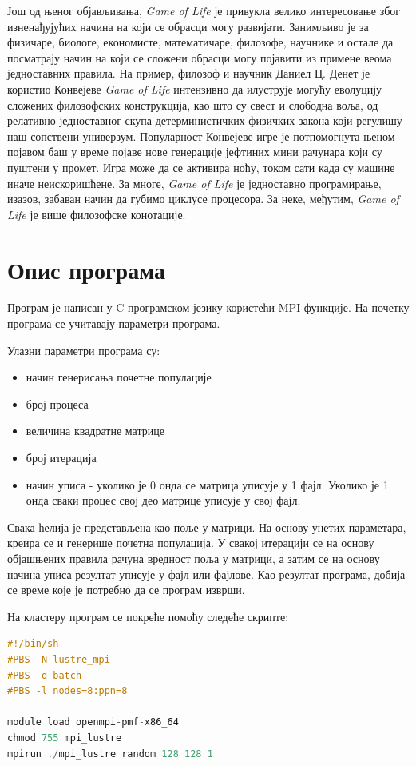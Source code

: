Још од њеног објављивања, \textit{Game of Life} је привукла велико интересовање због изненађујућих начина на који се обрасци могу развијати. Занимљиво је за физичаре, биологе, економисте, математичаре, филозофе, научнике и остале да посматрају начин на који се сложени обрасци могу појавити из примене веома једноставних правила. На пример, филозоф и научник Даниел Ц. Денет је користио Конвејеве \textit{Game of Life}  интензивно да илуструје могућу еволуцију сложених филозофских конструкција, као што су свест и слободна воља, од релативно једноставног скупа детерминистичких физичких закона који регулишу наш сопствени универзум.
Популарност Конвејеве игре је потпомогнута њеном појавом баш у време појаве нове генерације јефтиних мини рачунара који су пуштени у промет. Игра може да се активира ноћу, током сати када су машине иначе неискоришћене. За многе, \textit{Game of Life} је једноставно програмирање, изазов, забаван начин да губимо циклусе процесора. За неке, међутим, \textit{Game of Life} је више филозофске конотације.

\section{Опис програма}
Програм је написан у C програмском језику користећи MPI функције. На почетку програма се учитавају параметри програма. 

Улазни параметри програма су:
\begin{itemize}
\item начин генерисања почетне популације 
\item број процеса
\item величина квадратне матрице
\item број итерација
\item начин уписа - уколико је 0 онда се матрица уписује у 1 фајл. Уколико је 1 онда сваки процес свој део матрице уписује у свој фајл.
\end{itemize}
Свака ћелија је представљена као поље у матрици. На основу унетих параметара, креира се и генерише почетна популација. У свакој итерацији се на основу објашњених правила рачуна вредност поља у матрици, а затим се на основу начина уписа резултат уписује у фајл или фајлове. Као резултат програма, добија се време које је потребно да се програм изврши.

На кластеру програм се покреће помоћу следеће скрипте:

\begin{lstlisting}[style=nonumbers,frame=single,language=C, caption=Скрипта за покретање програма на кластеру]
#!/bin/sh
#PBS -N lustre_mpi
#PBS -q batch
#PBS -l nodes=8:ppn=8

module load openmpi-pmf-x86_64
chmod 755 mpi_lustre
mpirun ./mpi_lustre random 128 128 1 
\end{lstlisting}

